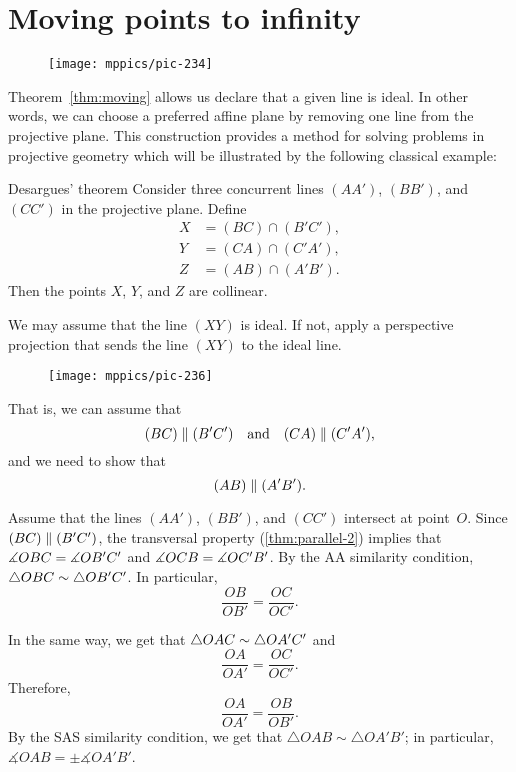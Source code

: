 \section{Moving points to infinity}

{

\begin{wrapfigure}{r}{37mm}
\vskip-8mm
\centering
\texttt{[image: mppics/pic-234]}
\end{wrapfigure}

Theorem~\ref{thm:moving} allows us declare that a given line is ideal.
In other words, we can choose a preferred affine plane by removing one line from the projective plane.
This construction provides a method for solving problems in projective geometry 
which will be illustrated by the following classical example:


\begin{thm}{Desargues' theorem}\label{thm:desargues}
Consider three concurrent lines $(AA')$, $(BB')$, and $(CC')$ in the projective plane.
Define 
\begin{align*}
X&=(BC)\cap (B'C'),\\
Y&=(CA)\cap (C'A'),\\
Z&=(AB)\cap (A'B').
\end{align*}
Then the points $X$, $Y$, and $Z$ are collinear.
\end{thm}

}

We may assume that the line $(XY)$ is ideal.
If not, apply a perspective projection that sends the line $(XY)$ to the ideal line.

\begin{wrapfigure}{o}{40mm}
\vskip-0mm
\centering
\texttt{[image: mppics/pic-236]}
\end{wrapfigure}

That is, we can assume that 
\[(BC)\parallel (B'C')\quad\text{and}\quad(CA)\parallel (C'A'),\]
and we need to show that 
\[(AB)\parallel(A'B').\]

Assume that the lines $(AA')$, $(BB')$, and $(CC')$ intersect at point~$O$.
Since $(BC)\parallel (B'C')$, 
the transversal property (\ref{thm:parallel-2}) implies that $\measuredangle OBC= \measuredangle OB'C'$ and $\measuredangle OCB= \measuredangle OC'B'$.
By the AA similarity condition, $\triangle OBC\sim\triangle OB'C'$.
In particular,
\[\frac{OB}{OB'}=\frac{OC}{OC'}.\]

In the same way, we get that $\triangle OAC\sim\triangle OA'C'$ and
\[\frac{OA}{OA'}=\frac{OC}{OC'}.\]
Therefore, 
\[\frac{OA}{OA'}=\frac{OB}{OB'}.\]
By the SAS similarity condition, 
we get that $\triangle OAB\sim\triangle OA'B'$;
in particular, $\measuredangle OAB=\pm\measuredangle OA'B'$.


